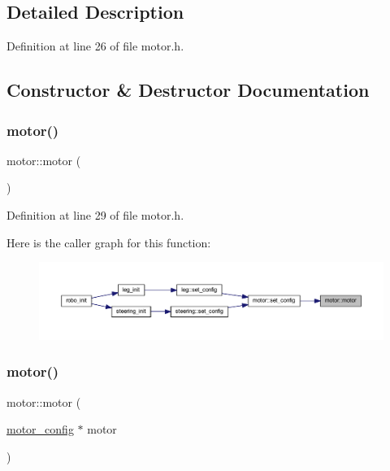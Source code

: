 \subsection{Detailed Description}


Definition at line 26 of file motor.\+h.



\subsection{Constructor \& Destructor Documentation}
\mbox{\label{classmotor_aa844d5f5525d4074814c6eb442a5edee}} 
\subsubsection{\texorpdfstring{motor()}{motor()}\hspace{0.1cm}{\footnotesize\ttfamily [1/4]}}
{\footnotesize\ttfamily motor\+::motor (\begin{DoxyParamCaption}{ }\end{DoxyParamCaption})\hspace{0.3cm}{\ttfamily [inline]}}



Definition at line 29 of file motor.\+h.

Here is the caller graph for this function\+:
\nopagebreak
\begin{figure}[H]
\begin{center}
\leavevmode
\includegraphics[width=350pt]{classmotor_aa844d5f5525d4074814c6eb442a5edee_icgraph}
\end{center}
\end{figure}
\mbox{\label{classmotor_a9c01c3708164e16c70e1140011d308e4}} 
\subsubsection{\texorpdfstring{motor()}{motor()}\hspace{0.1cm}{\footnotesize\ttfamily [2/4]}}
{\footnotesize\ttfamily motor\+::motor (\begin{DoxyParamCaption}\item[{\mbox{\hyperlink{structmotor__config}{motor\+\_\+config}} $\ast$}]{motor }\end{DoxyParamCaption})\hspace{0.3cm}{\ttfamily [inline]}}




